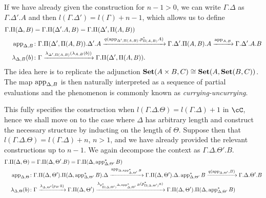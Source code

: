 \documentclass[a4paper,fontsize=12pt]{scrartcl}
\begin{document}
\begin{construction}
  If we have already given the construction for $n-1>0$, we can write
  $\Gamma.\Delta$ as $\Gamma.\Delta'.A$ and then
  $l(\Gamma.\Delta')=l(\Gamma)+n-1$, which allows us to define
  \begin{align*}
    \Gamma.\Pi(\Delta,B)
    &=\Gamma.\Pi(\Delta'.A,B)=\Gamma.\Pi(\Delta',\Pi(A,B)) \\
    \operatorname{app}_{\Delta,B} &\colon
                    \Gamma.\Pi(\Delta',\Pi(A,B)).\Delta'.A
                    \xrightarrow{q(\operatorname{app}_{\Delta',\Pi(A,B)},p^*_{\Pi(A,B)}A)}\Gamma.\Delta'.\Pi(A,B).A
                    \xrightarrow{\operatorname{app}_{A,B}}\Gamma.\Delta'.A.B \\
    \lambda_{\Delta,B}(b)
    &\colon
    \Gamma
    \xrightarrow{\lambda_{\Delta',\Pi(A,B)}(\lambda_{A,B}(b))}
    \Gamma.\Pi(\Delta',\Pi(A,B)).
  \end{align*}
  The idea here is to replicate the adjunction $\operatorname{\mathbf{Set}}(A\times
  B,C)\cong\operatorname{\mathbf{Set}}(A,\operatorname{\mathbf{Set}}(B,C))$. The map $\operatorname{app}_{\Delta,B}$ is then naturally
  interpreted as a sequence of partial evaluations and the phenomenon is
  commonly known as \emph{currying-uncurrying}.

  This fully specifies the construction when
  $l(\Gamma.\Delta.\Theta)=l(\Gamma.\Delta)+1$ in $\cC$, hence we shall move on
  to the case where $\Delta$ has arbitrary length and construct the necessary
  structure by inducting on the length of $\Theta$. Suppose then that
  $l(\Gamma.\Delta.\Theta)=l(\Gamma.\Delta)+n$, $n>1$, and we have already
  provided the relevant constructions up to $n-1$. We again decompose
  the context as $\Gamma.\Delta.\Theta'.B$.
  \begin{align*}
    \Gamma.\Pi(\Delta,\Theta)
    &=\Gamma.\Pi(\Delta,\Theta'.B)=\Gamma.\Pi(\Delta,\operatorname{app}^*_{\Delta,\Theta'}B) \\
    \operatorname{app}_{\Delta,\Theta}
    &\colon\Gamma.\Pi(\Delta,\Theta').\Pi(\Delta,\operatorname{app}^*_{\Delta,\Theta'}B).\Delta
    \xrightarrow{\operatorname{app}_{\Delta,\operatorname{app}^*_{\Delta,\Theta'}B}}
    \Gamma.\Pi(\Delta,\Theta').\Delta.\operatorname{app}^*_{\Delta,\Theta'}B
    \xrightarrow{q(\operatorname{app}_{\Delta,\Theta'},B)}
    \Gamma.\Delta.\Theta'.B \\
    \lambda_{\Delta,\Theta}(b)
    &\colon\Gamma
    \xrightarrow{\lambda_{\Delta,\Theta'}(p_B\cdot b)}
    \Gamma.\Pi(\Delta,\Theta')
    \xrightarrow{\lambda_{p^*_{\Pi(\Delta,\Theta')}\Delta,\operatorname{app}^*_{\Delta,\Theta'}B}(p_{\Pi(\Delta,\Theta')}^*a)}
    \Gamma.\Pi(\Delta,\Theta').\Pi(\Delta,\operatorname{app}^*_{\Delta,\Theta'}B)
  \end{align*}


\end{construction}
\end{document}
